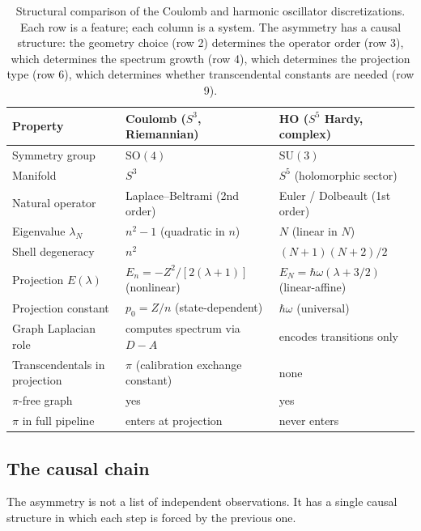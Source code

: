 \documentclass[twocolumn,pra,amsmath,amssymb,superscriptaddress]{revtex4-2}
\begin{document}
\begin{table}[t]
\centering
\caption{Structural comparison of the Coulomb and harmonic oscillator
discretizations.  Each row is a feature; each column is a system.
The asymmetry has a causal structure: the geometry choice (row 2)
determines the operator order (row 3), which determines the
spectrum growth (row 4), which determines the projection type
(row 6), which determines whether transcendental constants are
needed (row 9).}
\label{tab:asymmetry}
\begin{ruledtabular}
\begin{tabular}{lll}
Property & Coulomb ($S^3$, Riemannian) & HO ($S^5$ Hardy, complex) \\
\hline
Symmetry group & $\mathrm{SO}(4)$ & $\mathrm{SU}(3)$ \\
Manifold & $S^3$ & $S^5$ (holomorphic sector) \\
Natural operator & Laplace--Beltrami (2nd order) & Euler / Dolbeault (1st order) \\
Eigenvalue $\lambda_N$ & $n^2 - 1$ (quadratic in $n$) & $N$ (linear in $N$) \\
Shell degeneracy & $n^2$ & $(N+1)(N+2)/2$ \\
Projection $E(\lambda)$ & $E_n = -Z^2 / [2(\lambda + 1)]$ (nonlinear) & $E_N = \hbar\omega(\lambda + 3/2)$ (linear-affine) \\
Projection constant & $p_0 = Z / n$ (state-dependent) & $\hbar\omega$ (universal) \\
Graph Laplacian role & computes spectrum via $D - A$ & encodes transitions only \\
Transcendentals in projection & $\pi$ (calibration exchange constant) & none \\
$\pi$-free graph & yes & yes \\
$\pi$ in full pipeline & enters at projection & never enters \\
\end{tabular}
\end{ruledtabular}
\end{table}

\subsection{The causal chain}
\label{sec:causal}

The asymmetry is not a list of independent observations.  It has a
single causal structure in which each step is forced by the
previous one.
\end{document}
